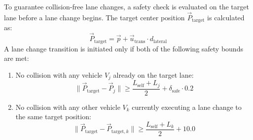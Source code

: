 \documentclass[../report_main.tex]{subfiles}
\begin{document}
To guarantee collision-free lane changes, a safety check is evaluated on the target lane before a lane change begins. The target center position $\overrightarrow{P}_{\text{target}}$ is calculated as:
\begin{equation}
    \overrightarrow{P}_{\text{target}} = \overrightarrow{p} + \overrightarrow{u}_{\text{trans}} \cdot d_{\text{lateral}}
\end{equation}
A lane change transition is initiated only if both of the following safety bounds are met:
\begin{enumerate}
    \item No collision with any vehicle $V_j$ already on the target lane:
    \begin{equation}
        \|\overrightarrow{P}_{\text{target}} - \overrightarrow{P}_j\| \geq \frac{L_{\text{self}} + L_j}{2} + \delta_{\text{safe}} \cdot 0.2
    \end{equation}
    \item No collision with any other vehicle $V_k$ currently executing a lane change to the same target position:
    \begin{equation}
        \|\overrightarrow{P}_{\text{target}} - \overrightarrow{P}_{\text{target}, k}\| \geq \frac{L_{\text{self}} + L_k}{2} + 10.0
    \end{equation}
\end{enumerate}
\end{document}
